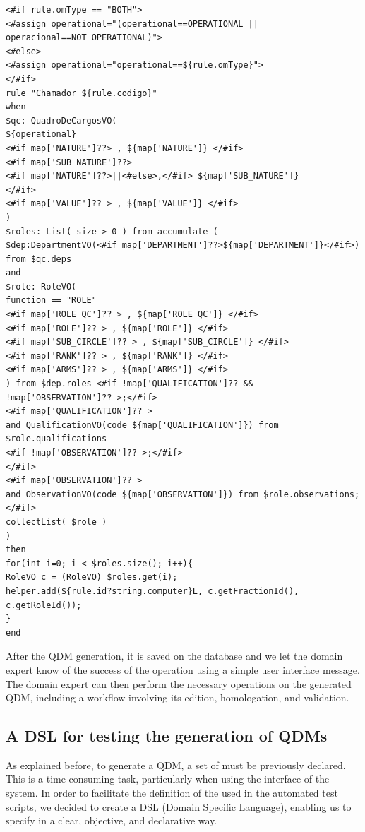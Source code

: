 \begin{lstlisting}[frame=single, language=Freemarker, caption={\it Freemarker template for generating DRL}, label={code:template},basicstyle=\scriptsize]
<#if rule.omType == "BOTH">
<#assign operational="(operational==OPERATIONAL || operacional==NOT_OPERATIONAL)">
<#else>
<#assign operational="operational==${rule.omType}">
</#if>
rule "Chamador ${rule.codigo}"   	
when
$qc: QuadroDeCargosVO( 
${operational} 				
<#if map['NATURE']??> , ${map['NATURE']} </#if>
<#if map['SUB_NATURE']??>
<#if map['NATURE']??>||<#else>,</#if> ${map['SUB_NATURE']}
</#if>
<#if map['VALUE']?? > , ${map['VALUE']} </#if> 
)	
$roles: List( size > 0 ) from accumulate ( 
$dep:DepartmentVO(<#if map['DEPARTMENT']??>${map['DEPARTMENT']}</#if>) from $qc.deps				  		   
and
$role: RoleVO(
function == "ROLE"
<#if map['ROLE_QC']?? > , ${map['ROLE_QC']} </#if>
<#if map['ROLE']?? > , ${map['ROLE']} </#if>
<#if map['SUB_CIRCLE']?? > , ${map['SUB_CIRCLE']} </#if> 
<#if map['RANK']?? > , ${map['RANK']} </#if>	
<#if map['ARMS']?? > , ${map['ARMS']} </#if>	 										
) from $dep.roles <#if !map['QUALIFICATION']?? && !map['OBSERVATION']?? >;</#if>		
<#if map['QUALIFICATION']?? >
and QualificationVO(code ${map['QUALIFICATION']}) from $role.qualifications 
<#if !map['OBSERVATION']?? >;</#if>	
</#if>				
<#if map['OBSERVATION']?? >
and ObservationVO(code ${map['OBSERVATION']}) from $role.observations;	
</#if>					
collectList( $role )
) 		
then		 
for(int i=0; i < $roles.size(); i++){       	
RoleVO c = (RoleVO) $roles.get(i);
helper.add(${rule.id?string.computer}L, c.getFractionId(), c.getRoleId());       
}               
end
\end{lstlisting}


After the QDM generation, it is saved on the database and we let the domain expert know 
of the success of the operation using a simple user interface message. 
The domain expert can then perform the necessary operations on the generated QDM, including a workflow 
involving  its edition, homologation, and validation.  

\subsection{A DSL for testing the generation of QDMs}

As explained before, to generate a QDM, a set of \callers must be previously 
declared. This is a time-consuming task, particularly when using the interface of 
the system. In order to facilitate the definition of the \callers used in the automated test scripts, we 
decided to create a DSL (Domain Specific Language), enabling us to specify \callers in a 
clear, objective, and declarative way. 

